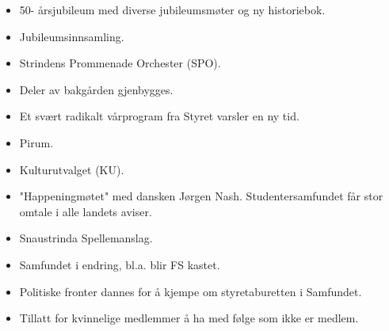 
\begin{itemize}
  \item 50- årsjubileum med diverse jubileumsmøter og ny historiebok.
  \item Jubileumsinnsamling.
\end{itemize}


\begin{itemize}
  \item Strindens Prommenade Orchester (SPO).
  \item Deler av bakgården gjenbygges.
\end{itemize}


\begin{itemize}
  \item Et svært radikalt vårprogram fra Styret varsler en ny tid.
  \item Pirum.
\end{itemize}


\begin{itemize}
  \item Kulturutvalget (KU). 
\end{itemize}


\begin{itemize}
  \item "Happeningmøtet" med dansken Jørgen Nash. Studentersamfundet får stor omtale i alle landets aviser.
  \item Snaustrinda Spellemanslag.
\end{itemize}


\begin{itemize}
  \item Samfundet i endring, bl.a. blir FS kastet.
  \item Politiske fronter dannes for å kjempe om styretaburetten i Samfundet. 
\end{itemize}


\begin{itemize}
  \item Tillatt for kvinnelige medlemmer å ha med følge som ikke er medlem.
\end{itemize}


